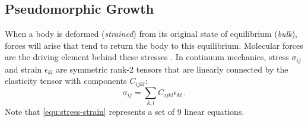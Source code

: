\subsection{Pseudomorphic Growth}
\label{sec:Theory_PseudomorphicGrowth}
When a body is deformed (\emph{strained}) from its original state of equilibrium (\emph{bulk}), forces will arise that tend to return the body to this equilibrium.
Molecular forces are the driving element behind these stresses
    \cite{landau1970}.
In continuum mechanics, stress $\sigma_{ij}$ and strain $\epsilon_{kl}$ are symmetric rank-2 tensors that are linearly connected by the elasticity tensor with components $C_{ijkl}$:
\begin{equation}\label{equ:stress-strain}
    \sigma_{ij}
    = \sum_{k,l} C_{ijkl}\epsilon_{kl}\,.
\end{equation}
Note that \eqref{equ:stress-strain} represents a set of 9 linear equations.

